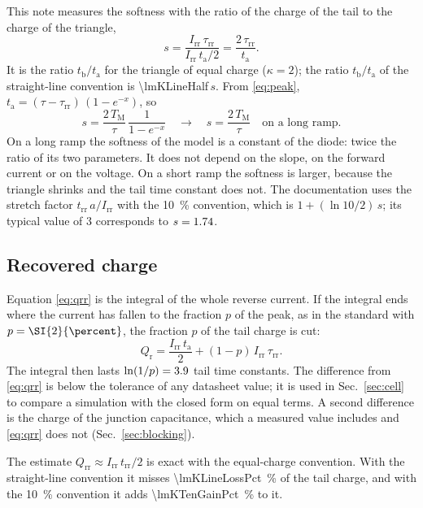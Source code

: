 \documentclass[10pt,a4paper]{scrartcl}
\newcommand{\Irr}{I_\mathrm{rr}}
\newcommand{\Qrr}{Q_\mathrm{rr}}
\newcommand{\trr}{t_\mathrm{rr}}
\newcommand{\ta}{t_\mathrm{a}}
\newcommand{\tb}{t_\mathrm{b}}
\newcommand{\taurr}{\tau_\mathrm{rr}}
\newcommand{\TM}{T_\mathrm{M}}
\begin{document}
This note measures the softness with the ratio of the charge of the tail to the charge of the triangle,
\begin{equation}
s = \frac{\Irr\,\taurr}{\Irr\,\ta/2} = \frac{2\,\taurr}{\ta} .
\label{eq:soft}
\end{equation}
It is the ratio $\tb/\ta$ for the triangle of equal charge ($\kappa = 2$); the ratio $\tb/\ta$ of the straight-line convention is \num{\lmKLineHalf}\,$s$. From \eqref{eq:peak}, $\ta = (\tau-\taurr)\,(1-e^{-x})$, so
\begin{equation}
s = \frac{2\,\TM}{\tau}\,\frac{1}{1-e^{-x}} \quad\longrightarrow\quad s = \frac{2\,\TM}{\tau} \quad \text{on a long ramp.}
\label{eq:softlong}
\end{equation}
On a long ramp the softness of the model is a constant of the diode: twice the ratio of its two parameters. It does not depend on the slope, on the forward current or on the voltage. On a short ramp the softness is larger, because the triangle shrinks and the tail time constant does not. The documentation \cite{mathworks} uses the stretch factor $\trr\,a/\Irr$ with the \SI{10}{\percent} convention, which is $1 + (\ln 10/2)\,s$; its typical value of 3 corresponds to $s = 1.74$.

\subsection{Recovered charge}
Equation \eqref{eq:qrr} is the integral of the whole reverse current. If the integral ends where the current has fallen to the fraction $p$ of the peak, as in the standard with $p = \SI{\lmPEndPct}{\percent}$, the fraction $p$ of the tail charge is cut:
\begin{equation}
Q_\mathrm{r} = \frac{\Irr\,\ta}{2} + (1-p)\,\Irr\,\taurr .
\label{eq:qrp}
\end{equation}
The integral then lasts $\ln(1/p) = 3.9$ tail time constants. The difference from \eqref{eq:qrr} is below the tolerance of any datasheet value; it is used in Sec.~\ref{sec:cell} to compare a simulation with the closed form on equal terms. A second difference is the charge of the junction capacitance, which a measured value includes and \eqref{eq:qrr} does not (Sec.~\ref{sec:blocking}).

The estimate $\Qrr \approx \Irr\,\trr/2$ is exact with the equal-charge convention. With the straight-line convention it misses \SI{\lmKLineLossPct}{\percent} of the tail charge, and with the \SI{10}{\percent} convention it adds \SI{\lmKTenGainPct}{\percent} to it.
\end{document}
